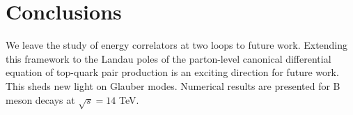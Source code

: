 \section{Conclusions}\label{sec:conclusions}

We leave the study of energy correlators at two loops to future work.
Extending this framework to the Landau poles of the parton-level
canonical differential equation of top-quark pair production is an
exciting direction for future work. This sheds new light on Glauber
modes. Numerical results are presented for B meson decays at $\sqrt{s} =
14$ TeV.

